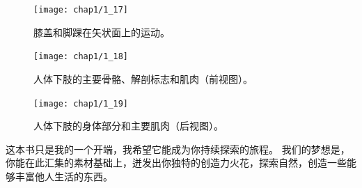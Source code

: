 \begin{figure}[!htb]
	\centering
	\texttt{[image: chap1/1\_17]}
	\caption{膝盖和脚踝在矢状面上的运动。 \label{fig:1_17}}
\end{figure}


\begin{figure}[!htb]
	\centering
	\texttt{[image: chap1/1\_18]}
	\caption{人体下肢的主要骨骼、解剖标志和肌肉（前视图）。 \label{fig:1_18}}
\end{figure}


\begin{figure}[!htb]
	\centering
	\texttt{[image: chap1/1\_19]}
	\caption{人体下肢的身体部分和主要肌肉（后视图）。 \label{fig:1_19}}
\end{figure}


这本书只是我的一个开端，我希望它能成为你持续探索的旅程。
我们的梦想是，你能在此汇集的素材基础上，迸发出你独特的创造力火花，探索自然，创造一些能够丰富他人生活的东西。
















